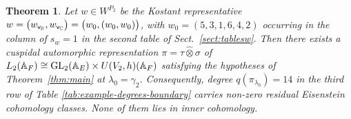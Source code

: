 \documentclass[a4paper,10pt]{amsart}
\newtheorem{thm}[equation]{Theorem}
\theoremstyle{definition}
\numberwithin{equation}{section}
\def\R{\mathbb R}
\def\C{\mathbb C}
\def\GL{{\rm GL}}
\def\vv{{\sf v}} %
\begin{document}
\begin{thm}\label{prop:nonempty-P2-example}
Let $w\in W^{P_2}$ be the Kostant representative $w=
        \bigl(
        w_{\vv_\R},w_{\vv_\C}
        \bigr)
        =
        \bigl(
        w_0,(w_0,w_0)
        \bigr)$, with $w_0=(5,3,1,6,4,2)$
occurring in the column of \(s_w=1\) in the second table of Sect.\ \ref{sect:tablesw}. Then there
exists a cuspidal automorphic representation $\pi=\tau\widehat\otimes\sigma$ of $L_2(\mathbb A_F)
        \cong
        \GL_2(\mathbb A_E)\times U(V_2,h)(\mathbb A_F)$
satisfying the hypotheses of Theorem~\ref{thm:main} at $\lambda_0=\gamma_2.$
Consequently, degree $ q(\pi_{\lambda_0})
        = 14$ in the third row of Table \ref{tab:example-degrees-boundary} carries non-zero residual Eisenstein cohomology classes. None of them lies in inner cohomology.
\end{thm}
\end{document}

